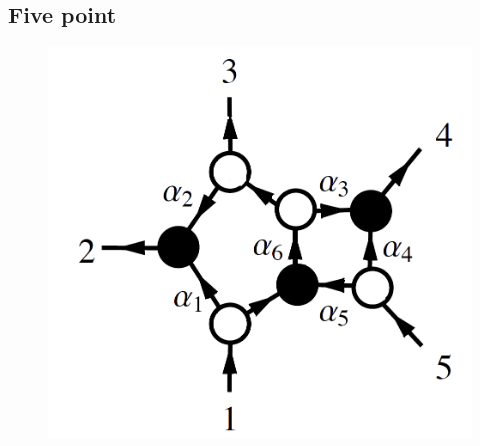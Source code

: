 \documentclass[letter,11pt]{article}
\begin{document}
\subsection{Five point}
\begin{figure}[H]
	\centering
	\includegraphics[width=0.3\linewidth]{5pt}
	\caption{}
	\label{fig:5pt}
\end{figure}
\end{document}
